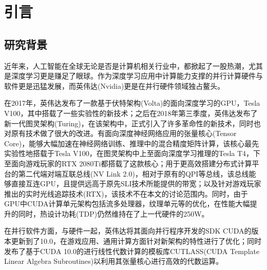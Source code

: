 \newpage
\section{引言}
\setcounter{table}{0}
\setcounter{figure}{0}
\subsection{研究背景}
\par 近年来，人工智能在全球无论是否是计算机相关行业中，都掀起了一股热潮，尤其是深度学习更是赚足了眼球。作为深度学习应用中计算能力支撑的并行计算硬件与软件更是迅猛发展，而英伟达(Nvidia)更是在并行硬件领域独占鳌头。
\par 在2017年，英伟达发布了一款基于伏特架构(Volta)的面向深度学习的GPU，Tesla V100\parencite{TESLAV100}，其中搭载了一些实验性的新技术；之后在2018年第三季度，英伟达发布了新一代图灵架构(Turing)，在该架构中，正式引入了许多革命性的新技术，同时也对原有技术做了很大的改进。有面向深度神经网络应用的张量核心(Tensor Core)\parencite{TENSORCORE}，能够大幅加速在神经网络训练、推理中的混合精度矩阵计算，该核心最先实验性地搭载于Tesla V100，在图灵架构中上至面向深度学习推理的Tesla T4，下至面向游戏玩家的RTX 2080Ti都搭载了这款核心；用于更高效搭建分布式计算平台的第二代端对端互联总线(NV Link 2.0)\parencite{NVLINK2}，相对于原有的QPI等总线，该总线能够直接互连GPU，且提供远高于原先SLI技术所能提供的带宽；以及针对游戏玩家推出的实时光线追踪技术(RTX)，该技术不在本文的讨论范围内。同时，由于GPU中CUDA计算单元架构包括流多处理器，纹理单元等的优化，在性能大幅提升的同时，热设计功耗(TDP)仍然维持在了上一代硬件的250W。
\par 在并行软件方面，与硬件一起，英伟达将其面向并行程序开发的SDK CUDA的版本更新到了10.0，在游戏应用、通用计算方面针对新架构的特性进行了优化；同时发布了基于CUDA 10.0的进行线性代数计算的模板库CUTLASS(CUDA Template Linear Algebra Subroutines)\parencite{CUTLASS}以利用其张量核心进行高效的代数运算。

